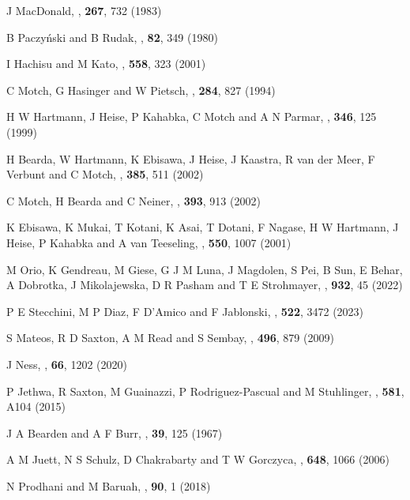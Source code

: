 \begin{thebibliography}{100}
	J MacDonald, \textit{\ApJ}, \textbf{267}, 732 (1983)
	
	B Paczy{\'n}ski and B Rudak, \textit{\AnA}, \textbf{82}, 349 (1980)
	
	I Hachisu and M Kato, \textit{\ApJ}, \textbf{558}, 323 (2001)
	
	C Motch, G Hasinger and W Pietsch, \textit{\AnA}, \textbf{284}, 827 (1994)

	H W Hartmann, J Heise, P Kahabka, C Motch and A N Parmar, \textit{\AnA}, \textbf{346}, 125 (1999)
	
	H Bearda, W Hartmann, K Ebisawa, J Heise, J Kaastra, R van der Meer, F Verbunt and C Motch, \textit{\AnA}, \textbf{385}, 511 (2002)

	C Motch, H Bearda and C Neiner, \textit{\AnA}, \textbf{393}, 913 (2002)

	K Ebisawa, K Mukai, T Kotani, K Asai, T Dotani, F Nagase, H W Hartmann, J Heise, P Kahabka and A van Teeseling, \textit{\ApJ}, \textbf{550}, 1007 (2001)

	M Orio, K Gendreau, M Giese, G J M Luna, J Magdolen, S Pei, B Sun, E Behar, A Dobrotka, J Mikolajewska, D R Pasham and T E Strohmayer, \textit{\ApJ}, \textbf{932}, 45 (2022)
	
	P E Stecchini, M P Diaz, F D’Amico and F Jablonski, \textit{\MNRAS}, \textbf{522}, 3472 (2023)
	
	S Mateos, R D Saxton, A M Read and S Sembay, \textit{\AnA}, \textbf{496}, 879 (2009)
	
	J Ness, \textit{\ASR}, \textbf{66}, 1202 (2020)
	
	P Jethwa, R Saxton, M Guainazzi, P Rodriguez-Pascual and M Stuhlinger, \textit{\AnA}, \textbf{581}, A104 (2015)
	
	J A Bearden and A F Burr, \textit{\RMP}, \textbf{39}, 125 (1967)
	
	A M Juett, N S Schulz, D Chakrabarty and T W Gorczyca, \textit{\ApJ}, \textbf{648}, 1066 (2006)
	
	N Prodhani and M Baruah, \textit{\Pram}, \textbf{90}, 1 (2018)
	

\end{thebibliography}
